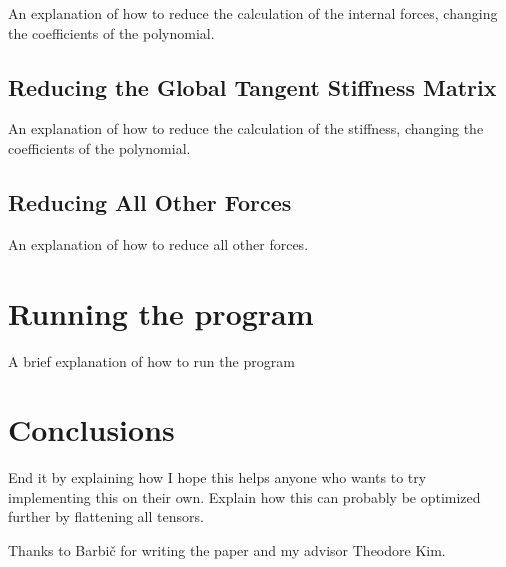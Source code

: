\documentclass[twocolumn,10pt]{asme2ej}
\begin{document}
An explanation of how to reduce the calculation of the internal forces, changing the coefficients
of the polynomial.

\subsection{Reducing the Global Tangent Stiffness Matrix}

An explanation of how to reduce the calculation of the stiffness, changing the coefficients
of the polynomial.

\subsection{Reducing All Other Forces}

An explanation of how to reduce all other forces.

\section{Running the program}

A brief explanation of how to run the program

\section{Conclusions}

End it by explaining how I hope this helps anyone who wants to try implementing this on their own.
Explain how this can probably be optimized further by flattening all tensors.

\begin{acknowledgment}

Thanks to Barbič for writing the paper and my advisor Theodore Kim.

\end{acknowledgment}


%
\end{document}
